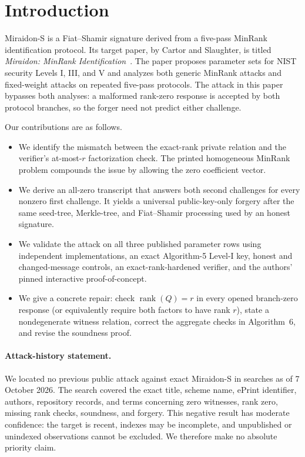 \documentclass[10pt,a4paper]{article}
\newcommand{\rank}{\operatorname{rank}}
\begin{document}
\noindent{}

\section{Introduction}

Miraidon-S is a Fiat--Shamir signature derived from a five-pass MinRank
identification protocol.  Its target paper, by Cartor and Slaughter, is titled
\emph{Miraidon: MinRank Identification}~\cite{miraidon}.  The paper proposes
parameter sets for NIST security Levels I, III, and V and analyzes both
generic MinRank attacks and fixed-weight attacks on repeated five-pass
protocols.  The attack in this paper bypasses both analyses: a malformed
rank-zero response is accepted by both protocol branches, so the forger need
not predict either challenge.

Our contributions are as follows.
\begin{itemize}
  \item We identify the mismatch between the exact-rank private relation and
  the verifier's at-most-$r$ factorization check.  The printed homogeneous
  MinRank problem compounds the issue by allowing the zero coefficient
  vector.
  \item We derive an all-zero transcript that answers both second challenges
  for every nonzero first challenge.  It yields a universal public-key-only
  forgery after the same seed-tree, Merkle-tree, and Fiat--Shamir processing
  used by an honest signature.
  \item We validate the attack on all three published parameter rows using
  independent implementations, an exact Algorithm-5 Level-I key, honest and
  changed-message controls, an exact-rank-hardened verifier, and the authors'
  pinned interactive proof-of-concept.
  \item We give a concrete repair: check $\rank(Q)=r$ in every opened
  branch-zero response (or equivalently require both factors to have rank
  $r$), state a nondegenerate witness relation, correct the aggregate checks
  in Algorithm~6, and revise the soundness proof.
\end{itemize}

\paragraph{Attack-history statement.}
We located no previous public attack against exact Miraidon-S in searches as
of 7 October 2026.  The search covered the exact title, scheme name, ePrint
identifier, authors, repository records, and terms concerning zero witnesses,
rank zero, missing rank checks, soundness, and forgery.  This negative result
has moderate confidence: the target is recent, indexes may be incomplete, and
unpublished or unindexed observations cannot be excluded.  We therefore make
no absolute priority claim.
\end{document}

